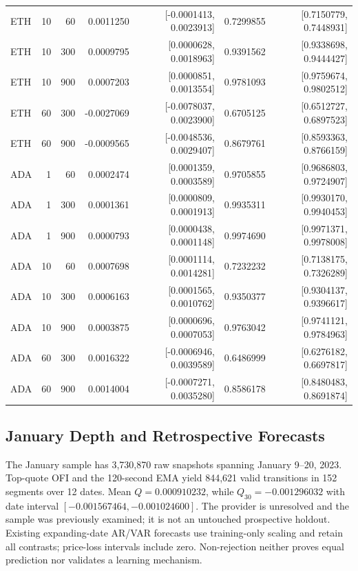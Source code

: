 \begin{table}[htbp]
{\begin{tabular}{lrrrrrr}
ETH & 10 & 60 & 0.0011250 & [-0.0001413, 0.0023913] & 0.7299855 & [0.7150779, 0.7448931] \\
ETH & 10 & 300 & 0.0009795 & [0.0000628, 0.0018963] & 0.9391562 & [0.9338698, 0.9444427] \\
ETH & 10 & 900 & 0.0007203 & [0.0000851, 0.0013554] & 0.9781093 & [0.9759674, 0.9802512] \\
ETH & 60 & 300 & -0.0027069 & [-0.0078037, 0.0023900] & 0.6705125 & [0.6512727, 0.6897523] \\
ETH & 60 & 900 & -0.0009565 & [-0.0048536, 0.0029407] & 0.8679761 & [0.8593363, 0.8766159] \\
ADA & 1 & 60 & 0.0002474 & [0.0001359, 0.0003589] & 0.9705855 & [0.9686803, 0.9724907] \\
ADA & 1 & 300 & 0.0001361 & [0.0000809, 0.0001913] & 0.9935311 & [0.9930170, 0.9940453] \\
ADA & 1 & 900 & 0.0000793 & [0.0000438, 0.0001148] & 0.9974690 & [0.9971371, 0.9978008] \\
ADA & 10 & 60 & 0.0007698 & [0.0001114, 0.0014281] & 0.7232232 & [0.7138175, 0.7326289] \\
ADA & 10 & 300 & 0.0006163 & [0.0001565, 0.0010762] & 0.9350377 & [0.9304137, 0.9396617] \\
ADA & 10 & 900 & 0.0003875 & [0.0000696, 0.0007053] & 0.9763042 & [0.9741121, 0.9784963] \\
ADA & 60 & 300 & 0.0016322 & [-0.0006946, 0.0039589] & 0.6486999 & [0.6276182, 0.6697817] \\
ADA & 60 & 900 & 0.0014004 & [-0.0007271, 0.0035280] & 0.8586178 & [0.8480483, 0.8691874] \\
\bottomrule\end{tabular}}
\end{table}

\subsection{January Depth and Retrospective Forecasts}
The January sample has 3,730,870 raw snapshots spanning January 9--20, 2023. Top-quote OFI and the 120-second EMA yield 844,621 valid transitions in 152 segments over 12 dates. Mean $Q=0.000910232$, while $Q_{30}=-0.001296032$ with date interval $[-0.001567464,-0.001024600]$. The provider is unresolved and the sample was previously examined; it is not an untouched prospective holdout. Existing expanding-date AR/VAR forecasts use training-only scaling and retain all contrasts; price-loss intervals include zero. Non-rejection neither proves equal prediction nor validates a learning mechanism.
